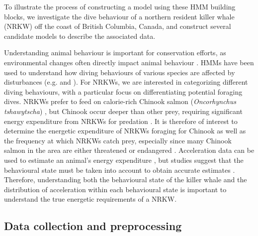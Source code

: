 

To illustrate the process of constructing a model using these HMM building blocks, we investigate the dive behaviour of a northern resident killer whale (NRKW) off the coast of British Columbia, Canada, and construct several candidate models to describe the associated data.

Understanding animal behaviour is important for conservation efforts, as environmental changes often directly impact animal behaviour \citep{Sutherland:1998}. HMMs have been used to understand how diving behaviours of various species are affected by disturbances (e.g. \citet{DeRuiter:2017} and \citet{Isojunno:2017}). For NRKWs, we are interested in categorizing different diving behaviours, with a particular focus on differentiating potential foraging dives. NRKWs prefer to feed on calorie-rich Chinook salmon (\textit{Oncorhynchus tshawytscha}) \citep{Ford:2006}, but Chinook occur deeper than other prey, requiring significant energy expenditure from NRKWs for predation \citep{Williams:2009,Noren:2011}. It is therefore of interest to determine the energetic expenditure of NRKWs foraging for Chinook as well as the frequency at which NRKWs catch prey, especially since many Chinook salmon in the area are either threatened or endangered \citep{Ford:2015}. Acceleration data can be used to estimate an animal's energy expenditure \citep{Green:2009,Wilson:2019}, but studies suggest that the behavioural state must be taken into account to obtain accurate estimates \citep{Dot:2016}. Therefore, understanding both the behavioural state of the killer whale and the distribution of acceleration within each behavioural state is important to understand the true energetic requirements of a NRKW.

\subsection{Data collection and preprocessing}

